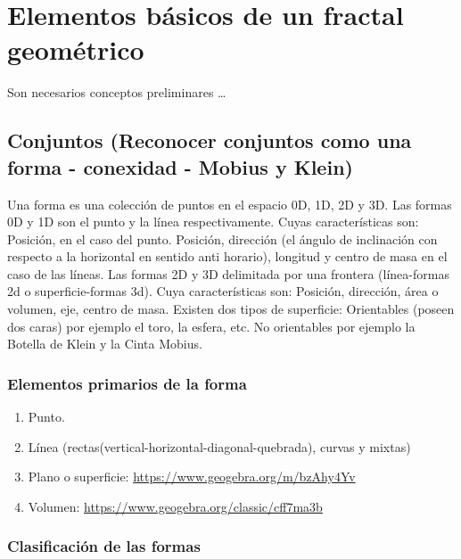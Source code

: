 \documentclass[
  11pt,
]{krantz}
\providecommand{\tightlist}{%
  \setlength{\itemsep}{0pt}\setlength{\parskip}{0pt}}
\theoremstyle{definition}
\theoremstyle{definition}
\theoremstyle{definition}
\theoremstyle{definition}
\theoremstyle{remark}
\begin{document}
\hypertarget{elementos-buxe1sicos-de-un-fractal-geomuxe9trico}{%
\chapter{Elementos básicos de un fractal geométrico}\label{elementos-buxe1sicos-de-un-fractal-geomuxe9trico}}

Son necesarios conceptos preliminares \ldots{}

\hypertarget{conjuntos-reconocer-conjuntos-como-una-forma---conexidad---mobius-y-klein}{%
\section{Conjuntos (Reconocer conjuntos como una forma - conexidad - Mobius y Klein)}\label{conjuntos-reconocer-conjuntos-como-una-forma---conexidad---mobius-y-klein}}

Una forma es una colección de puntos en el espacio 0D, 1D, 2D y 3D.
Las formas 0D y 1D son el punto y la línea respectivamente. Cuyas características son: Posición, en el caso del punto. Posición, dirección (el ángulo de inclinación con respecto a la horizontal en sentido anti horario), longitud y centro de masa en el caso de las líneas.
Las formas 2D y 3D delimitada por una frontera (línea-formas 2d o superficie-formas 3d). Cuya características son: Posición, dirección, área o volumen, eje, centro de masa. Existen dos tipos de superficie: Orientables (poseen dos caras) por ejemplo el toro, la esfera, etc. No orientables por ejemplo la Botella de Klein y la Cinta Mobius.

\hypertarget{elementos-primarios-de-la-forma}{%
\subsection{Elementos primarios de la forma}\label{elementos-primarios-de-la-forma}}

\begin{enumerate}
\def\labelenumi{\arabic{enumi}.}
\tightlist
\item
  Punto.
\item
  Línea (rectas(vertical-horizontal-diagonal-quebrada), curvas y mixtas)
\item
  Plano o superficie: \url{https://www.geogebra.org/m/bzAhy4Yv}
\item
  Volumen: \url{https://www.geogebra.org/classic/cff7ma3b}
\end{enumerate}

\hypertarget{clasificaciuxf3n-de-las-formas}{%
\subsection{Clasificación de las formas}\label{clasificaciuxf3n-de-las-formas}}
\end{document}
